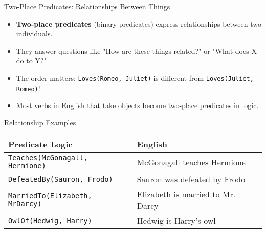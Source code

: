 \documentclass{beamer}
\begin{document}
	\begin{frame}{Two-Place Predicates: Relationships Between Things}
		\begin{itemize}
			\item \textbf{Two-place predicates} (binary predicates) express relationships between two individuals.
			\item They answer questions like "How are these things related?" or "What does X do to Y?"
			\item The order matters: \texttt{Loves(Romeo, Juliet)} is different from \texttt{Loves(Juliet, Romeo)}!
			\item Most verbs in English that take objects become two-place predicates in logic.
		\end{itemize}
		
		\begin{block}{Relationship Examples}
			\begin{table}[h]
				\centering
				\small
				\begin{tabular}{|l|l|}
					\hline
					\textbf{Predicate Logic} & \textbf{English} \\
					\hline
					\texttt{Teaches(McGonagall, Hermione)} & McGonagall teaches Hermione \\
					\texttt{DefeatedBy(Sauron, Frodo)} & Sauron was defeated by Frodo \\
					\texttt{MarriedTo(Elizabeth, MrDarcy)} & Elizabeth is married to Mr. Darcy \\
					\texttt{OwlOf(Hedwig, Harry)} & Hedwig is Harry's owl \\
					\hline
				\end{tabular}
			\end{table}
		\end{block}
	\end{frame}
	
\end{document}
